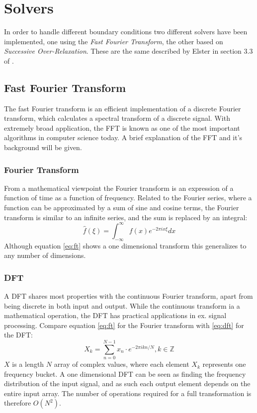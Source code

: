 \section{Solvers}\label{sec:background-solvers}
In order to handle different boundary conditions two different solvers have been implemented, one using the \emph{Fast Fourier
Transform}, the other based on \emph{Successive Over-Relaxation}. These are the same described by Elster in section 3.3 of \cite{elster94}.

\subsection{Fast Fourier Transform}
The fast Fourier transform is an efficient implementation of a discrete Fourier transform, which calculates a spectral
transform of a discrete signal. With extremely broad application, the FFT is known as one of the most important algorithms
in computer science today. A brief explanation of the FFT and it's background will be given.

\subsubsection*{Fourier Transform}
From a mathematical viewpoint the Fourier transform is an expression of a function of time as a function of frequency.
Related to the Fourier series, where a function can be approximated by a sum of sine and cosine terms, the Fourier
transform is similar to an infinite series, and the sum is replaced by an integral:
\begin{equation}
	\label{eq:ft}
	\hat{f}(\xi) = \int_{-\infty}^\infty f(x) e^{-2\pi i x \xi} dx
\end{equation}
Although equation \ref{eq:ft} shows a one dimensional transform this generalizes to any number of dimensions.

\subsubsection*{DFT}
A DFT shares most properties with the continuous Fourier transform, apart from being discrete in both input and output.
While the continuous transform ia a mathematical operation, the DFT has practical applications in ex. signal processing.
Compare equation \ref{eq:ft} for the Fourier transform with \ref{eq:dft} for the DFT:
\begin{equation}
	\label{eq:dft}
	X_k = \sum_{n=0}^{N-1} x_n \cdot e^{- 2\pi i k n / N}, k \in \mathbb{Z}
\end{equation}
$X$ is a length $N$ array of complex values, where each element $X_k$ represents one frequency bucket. A one dimensional DFT
 can be seen as finding the frequency distribution of the input signal, and as such each output element depends on the
 entire input array. The number of operations required for a full transformation is therefore $O(N^2)$.


